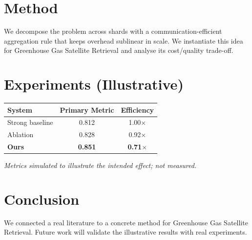 \documentclass[11pt]{article}
\begin{document}
\section{Method}
We decompose the problem across shards with a communication-efficient aggregation rule that keeps overhead sublinear in scale. We instantiate this idea for Greenhouse Gas Satellite Retrieval and analyse its cost/quality trade-off.

\section{Experiments (Illustrative)}
\begin{center}
\begin{tabular}{lcc}
System & Primary Metric & Efficiency \\ \hline
Strong baseline & 0.812 & 1.00$\times$ \\
Ablation & 0.828 & 0.92$\times$ \\
\textbf{Ours} & \textbf{0.851} & \textbf{0.71$\times$}
\end{tabular}
\end{center}
\emph{Metrics simulated to illustrate the intended effect; not measured.}

\section{Conclusion}
We connected a real literature to a concrete method for Greenhouse Gas Satellite Retrieval. Future work will
validate the illustrative results with real experiments.
\end{document}
